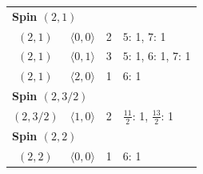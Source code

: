 \begin{longtable}{c c c p{8.8cm}}
\midrule
\multicolumn{4}{l}{\textbf{Spin $(2,1)$}}\\
$(2,1)$ & $\langle 0,0\rangle$ & 2 & $5$: 1, $7$: 1 \\
$(2,1)$ & $\langle 0,1\rangle$ & 3 & $5$: 1, $6$: 1, $7$: 1 \\
$(2,1)$ & $\langle 2,0\rangle$ & 1 & $6$: 1 \\
\midrule
\multicolumn{4}{l}{\textbf{Spin $(2,3/2)$}}\\
$(2,3/2)$ & $\langle 1,0\rangle$ & 2 & $\frac{11}{2}$: 1, $\frac{13}{2}$: 1 \\
\midrule
\multicolumn{4}{l}{\textbf{Spin $(2,2)$}}\\
$(2,2)$ & $\langle 0,0\rangle$ & 1 & $6$: 1 \\
\bottomrule
\end{longtable}
